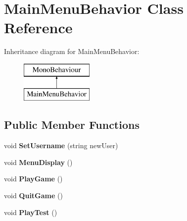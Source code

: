 \hypertarget{class_main_menu_behavior}{}\section{Main\+Menu\+Behavior Class Reference}
\label{class_main_menu_behavior}
Inheritance diagram for Main\+Menu\+Behavior\+:\begin{figure}[H]
\begin{center}
\leavevmode
\includegraphics[height=2.000000cm]{class_main_menu_behavior}
\end{center}
\end{figure}
\subsection*{Public Member Functions}
\begin{DoxyCompactItemize}
\item 
\mbox{\label{class_main_menu_behavior_a248fc73ca12d3bd0ded59da658a53df8}} 
void {\bfseries Set\+Username} (string new\+User)
\item 
\mbox{\label{class_main_menu_behavior_a8f404fbb0c8212fa405a7c79a051e120}} 
void {\bfseries Menu\+Display} ()
\item 
\mbox{\label{class_main_menu_behavior_ae01826edae2c48636a5ba76bfa193ea6}} 
void {\bfseries Play\+Game} ()
\item 
\mbox{\label{class_main_menu_behavior_a90c233e4e405f363cdde95ecc0532b17}} 
void {\bfseries Quit\+Game} ()
\item 
\mbox{\label{class_main_menu_behavior_a781e8e3a21a016ef2c3c6410d20c1026}} 
void {\bfseries Play\+Test} ()
\end{DoxyCompactItemize}
